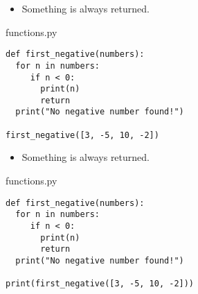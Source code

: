 \documentclass[aspectratio=1610,slidestop]{beamer}
\begin{document}
\begin{pframe}
 \begin{itemize}
  \item Something is always returned.
 \end{itemize}
 \medskip

 \begin{minipage}[t]{0.52\textwidth}
  \begin{pythonfile}{functions.py}
   \begin{verbatim}
def first_negative(numbers):
  for n in numbers:
     if n < 0:
       print(n)
       return
  print("No negative number found!")

first_negative([3, -5, 10, -2])
   \end{verbatim}
  \end{pythonfile}
 \end{minipage}\qquad
 \begin{minipage}[t]{0.42\textwidth}
 \vspace{-4.15cm}
 \begin{terminal}
 \end{terminal}
 \end{minipage}
\end{pframe}


\begin{pframe}
 \addtocounter{framenumber}{-1}
 \begin{itemize}
  \item Something is always returned.
 \end{itemize}
 \medskip

 \begin{minipage}[t]{0.52\textwidth}
  \begin{pythonfile}{functions.py}
   \begin{verbatim}
def first_negative(numbers):
  for n in numbers:
     if n < 0:
       print(n)
       return
  print("No negative number found!")

print(first_negative([3, -5, 10, -2]))
   \end{verbatim}
  \end{pythonfile}
 \end{minipage}\qquad
 \pause
 \begin{minipage}[t]{0.42\textwidth}
 \vspace{-4.15cm}
 \begin{terminal}
 \end{terminal}
 \end{minipage}
\end{pframe}
\end{document}
